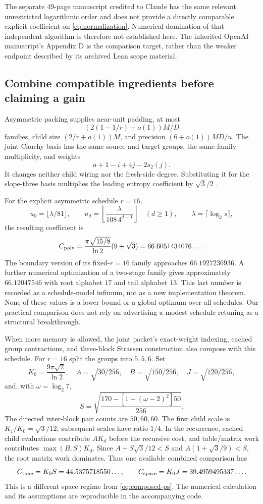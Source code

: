 \documentclass[11pt,letterpaper]{article}
\theoremstyle{definition}\newtheorem{definition}[theorem]{Definition}
\theoremstyle{remark}\newtheorem{remark}[theorem]{Remark}
\newcommand{\pop}{s_2}
\begin{document}
The separate $49$-page manuscript credited to Claude has the same relevant
unrestricted logarithmic order and does not provide a directly comparable
explicit coefficient on \eqref{eq:normalization}. Numerical domination of
that independent algorithm is therefore not established here. The inherited
OpenAI manuscript's Appendix D is the comparison target, rather than the
weaker endpoint described by its archived Lean scope material.

\subsection{Combine compatible ingredients before claiming a gain}
Asymmetric packing supplies near-unit padding, at most
\[
 (2(1-1/r)+o(1))M/D
\]
families, child size $(2/r+o(1))M$, and precision $(6+o(1))MD/u$.
The joint Cauchy basis has the same source and target groups, the same
family multiplicity, and weights
\[
 a+1-i+4j-2\pop(j).
\]
It changes neither child wiring nor the fresh-side degree. Substituting
it for the slope-three basis multiplies the leading entropy coefficient
by $\sqrt3/2$ \cite{asym,joint}.

For the explicit asymmetric schedule $r=16$,
\[
 u_0=\lfloor\lambda/81\rfloor,\qquad
 u_d=\left\lfloor\frac{\lambda}{108\,4^{d-1}}\right\rfloor\quad(d\ge1),
 \qquad\lambda=\lceil\log_2s\rceil,
\]
the resulting coefficient is
\begin{equation}\label{eq:composed-ps}
 C_{\rm poly}=\frac{\pi\sqrt{15/8}}{\ln2}(9+\sqrt3)
 =66.6051434076\ldots .
\end{equation}
The boundary version of its fixed-$r=16$ family approaches
$66.1927236936$. A further numerical optimization of a two-stage family
gives approximately $66.12047546$ with root alphabet $17$ and tail alphabet
$13$. This last number is recorded as a schedule-model infimum, not as a
new implementation theorem. None of these values is a lower bound or a
global optimum over all schedules. Our practical comparison does not rely
on advertising a modest schedule retuning as a structural breakthrough.

When more memory is allowed, the joint packet's exact-weight indexing,
cached group contractions, and three-block Strassen construction also
compose with this schedule. For $r=16$ split the groups into $5,5,6$.
Set
\[
 K_0=\frac{9\pi\sqrt2}{\ln2},\quad
 A=\sqrt{30/256},\quad B=\sqrt{150/256},\quad J=\sqrt{120/256},
\]
and, with $\omega=\log_2 7$,
\[
 S=\sqrt{\frac{170-[1-(\omega-2)^2]50}{256}}.
\]
The directed inter-block pair counts are $50,60,60$.
The first child scale is $K_1/K_0=\sqrt3/12$; subsequent scales have ratio
$1/4$. In the recurrence, cached child evaluations contribute
$A K_d$ before the recursive cost, and table/matrix work contributes
$\max(B,S)K_d$. Since
$A+S\sqrt3/12<S$ and $A(1+\sqrt3/9)<S$, the root matrix work dominates.
Thus one available combined comparison has
\begin{equation}\label{eq:composed-exp}
 C_{\rm time}=K_0S=44.5375718550\ldots,\qquad
 C_{\rm space}=K_0J=39.4959495337\ldots .
\end{equation}
This is a different space regime from \eqref{eq:composed-ps}. The numerical
calculation and its assumptions are reproducible in the accompanying code.
\end{document}
